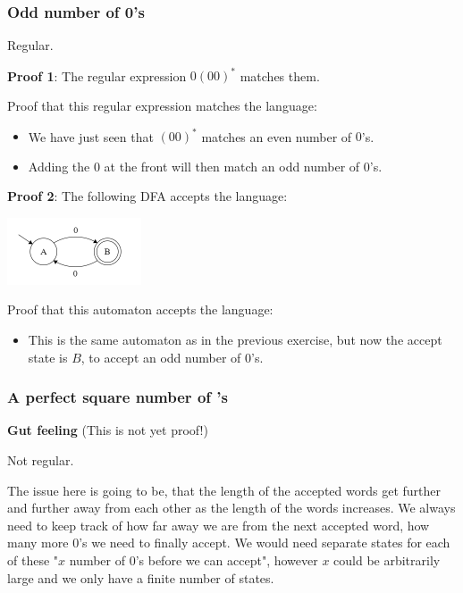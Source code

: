 \subsubsection{Odd number of 0's}

Regular.

\textbf{Proof 1}: The regular expression $0(00)^*$ matches them.

Proof that this regular expression matches the language:

\begin{itemize}
    \item We have just seen that $(00)^*$ matches an even number of $0$'s.
    \item Adding the $0$ at the front will then match an odd number of $0$'s.
\end{itemize}

\textbf{Proof 2}: The following DFA accepts the language:

\includegraphics[width=150px]{03/odd_zeroes.png}

Proof that this automaton accepts the language:

\begin{itemize}
    \item This is the same automaton as in the previous exercise, but now the accept state is $B$, to accept an odd number of $0$'s.
\end{itemize}

\subsubsection{A perfect square number of 's}

\textbf{Gut feeling} (This is not yet proof!)

Not regular.

The issue here is going to be, that the length of the accepted words get further and further away from each other as the length of the words increases. We always need to keep track of how far away we are from the next accepted word, how many more $0$'s we need to finally accept. We would need separate states for each of these "$x$ number of $0$'s before we can accept", however $x$ could be arbitrarily large and we only have a finite number of states.


